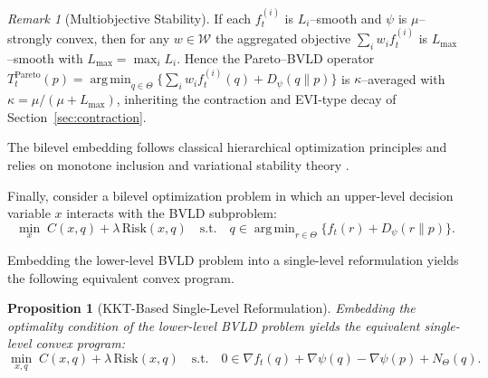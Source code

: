 \documentclass[11pt]{article}
\DeclareMathOperator*{\argmin}{arg\,min}
\theoremstyle{plain}
\newtheorem{proposition}[theorem]{Proposition}
\theoremstyle{definition}
\theoremstyle{remark}
\newtheorem{remark}[theorem]{Remark}
\begin{document}
\begin{remark}[Multiobjective Stability]
If each $f_t^{(i)}$ is $L_i$–smooth and $\psi$ is $\mu$–strongly convex, 
then for any $w\in\mathcal W$ the aggregated objective 
$\sum_i w_i f_t^{(i)}$ is $L_{\max}$–smooth with $L_{\max}=\max_i L_i$.
Hence the Pareto–BVLD operator 
$T_t^{\mathrm{Pareto}}(p)=\argmin_{q\in\Theta}\{\sum_i w_i f_t^{(i)}(q)+D_\psi(q\|p)\}$
is $\kappa$–averaged with 
$\kappa=\mu/(\mu+L_{\max})$, inheriting the contraction and EVI-type decay 
of Section~\ref{sec:contraction}.
\end{remark}



The bilevel embedding follows classical hierarchical optimization principles
\cite{Colson2007,Sinha2017,Dempe2020}
and relies on monotone inclusion and variational stability theory
\cite{Bauschke2017,Mordukhovich2018,DontchevRockafellar2009}.

Finally, consider a bilevel optimization problem in which an upper-level 
decision variable $x$ interacts with the BVLD subproblem:
\begin{equation}
\min_{x}\; C(x,q)+\lambda\,\mathrm{Risk}(x,q)
\quad
\text{s.t.}\quad
q\in\argmin_{r\in\Theta}\{f_t(r)+D_\psi(r\|p)\}.
\label{eq:bilevel}
\end{equation}

Embedding the lower-level BVLD problem into a single-level reformulation 
yields the following equivalent convex program.

\begin{proposition}[KKT-Based Single-Level Reformulation]
\label{prop:bilevel}
Embedding the optimality condition of the lower-level BVLD problem 
yields the equivalent single-level convex program:
\begin{equation}
\min_{x,q}\;
C(x,q)+\lambda\,\mathrm{Risk}(x,q)
\quad
\text{s.t.}\quad
0\in\nabla f_t(q)+\nabla\psi(q)-\nabla\psi(p)+N_\Theta(q).
\label{eq:singlelevel}
\end{equation}
\end{proposition}
\end{document}
